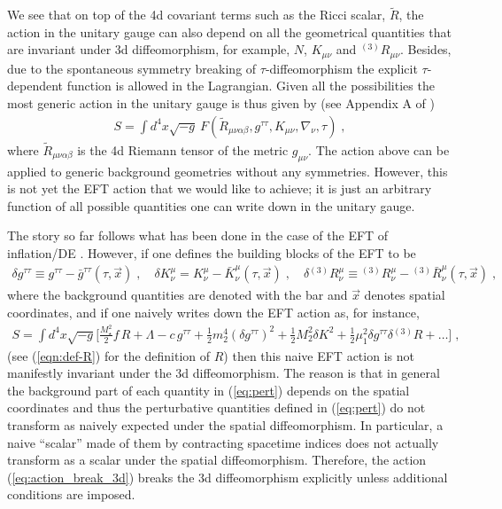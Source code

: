 \documentclass[a4paper,11pt]{article}
\numberwithin{equation}{section}
\begin{document}
We see that on top of the 4d covariant terms such as the Ricci scalar, $\tilde{R}$, the action in the unitary gauge can also depend on all the geometrical quantities that are invariant under 3d diffeomorphism, for example, $N$, $K_{\mu\nu}$ and ${}^{(3)}\!R_{\mu\nu}$. Besides, due to the spontaneous symmetry breaking of $\tau$-diffeomorphism the explicit $\tau$-dependent function is allowed in the Lagrangian.  Given all the possibilities the most generic action in the unitary gauge is thus given by (see Appendix A of \cite{Cheung:2007st})
\begin{align}\label{eq:EFT_generic}
S = \int d^4x \sqrt{-g}~F(\tilde{R}_{\mu\nu\alpha\beta},g^{\tau\tau},K_{\mu\nu},\nabla_\nu,\tau) \;,
\end{align}
where $\tilde{R}_{\mu\nu\alpha\beta}$ is the 4d Riemann tensor of the metric $g_{\mu\nu}$. The action above can be applied to generic background geometries without any symmetries. However, this is not yet the EFT action that we would like to achieve; it is just an arbitrary function of all possible quantities one can write down in the unitary gauge. 

The story so far follows what has been done in the case of the EFT of inflation/DE \cite{Cheung:2007st,Gubitosi:2012hu}. However, if one defines the building blocks of the EFT to be 
\begin{align}\label{eq:pert}
\delta g^{\tau\tau} \equiv g^{\tau\tau} - \bar{g}^{\tau\tau}(\tau,\vec{x})\;, \quad \delta K^\mu_\nu = K^\mu_\nu - \bar{K}^\mu_\nu(\tau,\vec{x})\;, \quad \delta {}^{(3)}\!R^\mu_\nu \equiv {}^{(3)}\!R^\mu_\nu - {}^{(3)}\!\bar{R}^\mu_\nu(\tau,\vec{x}) \;,
\end{align}
where the background quantities are denoted with the bar and $\vec{x}$ denotes spatial coordinates, and if one naively writes down the EFT action as, for instance,
\begin{align}\label{eq:action_break_3d}
S = \int d^4 x \sqrt{-g}\bigg[\frac{M_\star^2}{2}f\, R + \Lambda - c\, g^{\tau\tau} + \frac{1}{2}m_2^4(\delta g^{\tau\tau})^2  + \frac{1}{2}M_2^2 \delta K^2 + \frac{1}{2}\mu_1^2\delta g^{\tau\tau} \delta {}^{(3)}\!R + \ldots \bigg] \;,
\end{align}
(see (\ref{eqn:def-R}) for the definition of $R$) then this naive EFT action is not manifestly invariant under the 3d diffeomorphism. The reason is that in general the background part of each quantity in (\ref{eq:pert}) depends on the spatial coordinates and thus the perturbative quantities defined in (\ref{eq:pert}) do not transform as naively expected under the spatial diffeomorphism. In particular, a naive ``scalar'' made of them by contracting spacetime indices does not actually transform as a scalar under the spatial diffeomorphism. Therefore, the action (\ref{eq:action_break_3d}) breaks the 3d diffeomorphism explicitly unless additional conditions are imposed. 
\end{document}
